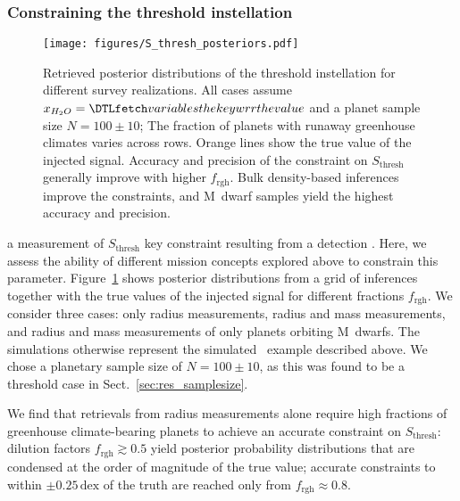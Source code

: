 \documentclass[twocolumn,twocolappendix,linenumbers]{aastex631}
\begin{document}
\subsubsection{Constraining the threshold instellation}\label{sec:res_constrain-S_thresh}
\begin{figure}[ht!]
    \begin{centering}
        \texttt{[image: figures/S\_thresh\_posteriors.pdf]}
        \caption{
            Retrieved posterior distributions of the threshold instellation for different survey realizations.
            All cases assume $x_{H_2O} = \var{wrr}$ and a planet sample size $N=100\pm10$; The fraction of planets with runaway greenhouse climates varies across rows.
            Orange lines show the true value of the injected signal.
            Accuracy and precision of the constraint on $S_\mathrm{thresh}$ generally improve with higher $f_\mathrm{rgh}$.
            Bulk density-based inferences improve the constraints, and M~dwarf samples yield the highest accuracy and precision.
        }
        \label{fig:posterior_surveys}
    \end{centering}
\end{figure}
a measurement of $S_\mathrm{thresh}$  key constraint resulting from a detection .
Here, we assess the ability of different mission concepts explored above to constrain this parameter.
Figure~\ref{fig:posterior_surveys} shows posterior distributions from a grid of inferences together with the true values of the injected signal for different fractions $f_\mathrm{rgh}$.
We consider three cases: only radius measurements, radius and mass measurements, and radius and mass measurements of only planets orbiting M~dwarfs.
The simulations otherwise represent the simulated \plato\ example described above.
We chose a planetary sample size of $N=100\pm10$, as this was found to be a threshold case in Sect.~\ref{sec:res_samplesize}.

We find that retrievals from radius measurements alone require high fractions of greenhouse climate-bearing planets to achieve an accurate constraint on $S_\mathrm{thresh}$:
dilution factors $f_\mathrm{rgh} \gtrsim 0.5$ yield posterior probability distributions that are condensed at the order of magnitude of the true value; accurate constraints to within $\pm 0.25\,\mathrm{dex}$ of the truth are reached only from $f_\mathrm{rgh} \approx 0.8$.
\end{document}
